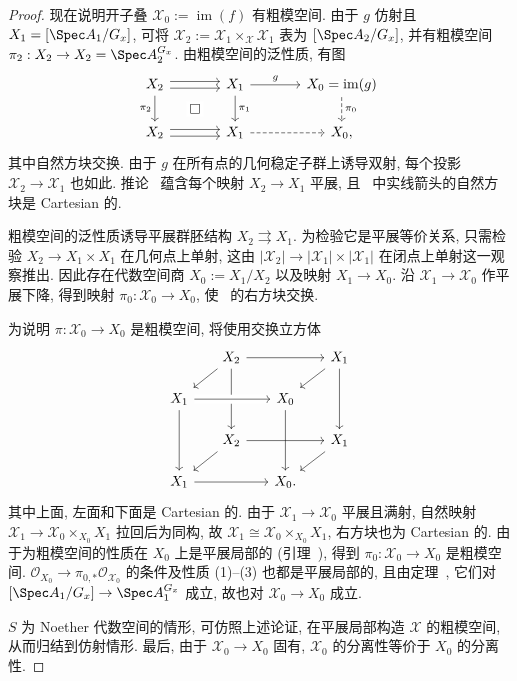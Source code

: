 \begin{proof}
现在说明开子叠 $\mathcal X_0:=\operatorname{im}(f)$ 有粗模空间. 由于 $g$ 仿射且 $\mathcal X_1=[\Spec A_1/G_x]$, 可将 $\mathcal X_2:=\mathcal X_1\times_{\mathcal X}\mathcal X_1$ 表为 $[\Spec A_2/G_x]$, 并有粗模空间 $\pi_2:\mathcal X_2\to X_2=\Spec A_2^{G_x}$. 由粗模空间的泛性质, 有图
\begin{equation}\label{src:5.4.9}
\begin{tikzcd}[column sep=large]
\mathcal X_2\arrow[r,shift left]\arrow[r,shift right]\arrow[d,"\pi_2"']&\mathcal X_1\arrow[r,"g"]\arrow[d,"\pi_1"]&\mathcal X_0=\operatorname{im}(g)\arrow[d,dashed,"\pi_0"]\\
X_2\arrow[r,shift left]\arrow[r,shift right]\arrow[ur,phantom,"\square" description]&X_1\arrow[r,dashed]&X_0,
\end{tikzcd}
\end{equation}
其中自然方块交换. 由于 $g$ 在所有点的几何稳定子群上诱导双射, 每个投影 $\mathcal X_2\to\mathcal X_1$ 也如此. 推论~ 蕴含每个映射 $X_2\to X_1$ 平展, 且~ 中实线箭头的自然方块是 Cartesian 的.

粗模空间的泛性质诱导平展群胚结构 $X_2\rightrightarrows X_1$. 为检验它是平展等价关系, 只需检验 $X_2\to X_1\times X_1$ 在几何点上单射, 这由 $|\mathcal X_2|\to|\mathcal X_1|\times|\mathcal X_1|$ 在闭点上单射这一观察推出. 因此存在代数空间商 $X_0:=X_1/X_2$ 以及映射 $X_1\to X_0$. 沿 $\mathcal X_1\to\mathcal X_0$ 作平展下降, 得到映射 $\pi_0:\mathcal X_0\to X_0$, 使~ 的右方块交换.

为说明 $\pi:\mathcal X_0\to X_0$ 是粗模空间, 将使用交换立方体
\[
\begin{tikzcd}[row sep=1.4em,column sep=1.6em]
&\mathcal X_2\arrow[rr]\arrow[dl]\arrow[dd]&&\mathcal X_1\arrow[dl]\arrow[dd]\\
\mathcal X_1\arrow[rr,crossing over]\arrow[dd]&&\mathcal X_0\arrow[dd]&\\
&X_2\arrow[rr]\arrow[dl]&&X_1\arrow[dl]\\
X_1\arrow[rr]&&X_0.&
\end{tikzcd}
\]
其中上面, 左面和下面是 Cartesian 的. 由于 $\mathcal X_1\to\mathcal X_0$ 平展且满射, 自然映射 $\mathcal X_1\to\mathcal X_0\times_{X_0}X_1$ 拉回后为同构, 故 $\mathcal X_1\cong\mathcal X_0\times_{X_0}X_1$, 右方块也为 Cartesian 的. 由于为粗模空间的性质在 $X_0$ 上是平展局部的 (引理~), 得到 $\pi_0:\mathcal X_0\to X_0$ 是粗模空间. $\mathcal O_{X_0}\to\pi_{0,*}\mathcal O_{\mathcal X_0}$ 的条件及性质 (1)--(3) 也都是平展局部的, 且由定理~, 它们对 $[\Spec A_1/G_x]\to\Spec A_1^{G_x}$ 成立, 故也对 $\mathcal X_0\to X_0$ 成立.

$S$ 为 Noether 代数空间的情形, 可仿照上述论证, 在平展局部构造 $\mathcal X$ 的粗模空间, 从而归结到仿射情形. 最后, 由于 $\mathcal X_0\to X_0$ 固有, $\mathcal X_0$ 的分离性等价于 $X_0$ 的分离性.
\end{proof}
